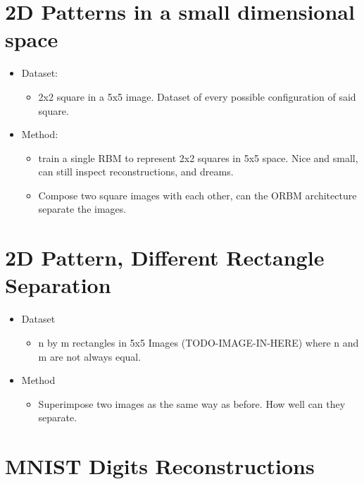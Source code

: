 

\section{2D Patterns in a small dimensional space}



\begin{itemize}
    \item Dataset:
    \begin{itemize}
      \item 2x2 square in a 5x5 image. Dataset of every possible configuration of said square.
    \end{itemize}
    \item Method:
    \begin{itemize}
      \item train a single RBM to represent 2x2 squares in 5x5 space. Nice and small, can still inspect reconstructions, and dreams.
      \item Compose two square images with each other, can the ORBM architecture separate the images.
    \end{itemize}
  \end{itemize}

    \section{2D Pattern, Different Rectangle Separation}
    \begin{itemize}
      \item Dataset
      \begin{itemize}
        \item n by m rectangles in 5x5 Images (TODO-IMAGE-IN-HERE) where n and m are not always equal.
      \end{itemize}
      \item Method
      \begin{itemize}
        \item Superimpose two images as the same way as before. How well can they separate.
      \end{itemize}
    \end{itemize}

    \section{MNIST Digits Reconstructions}


